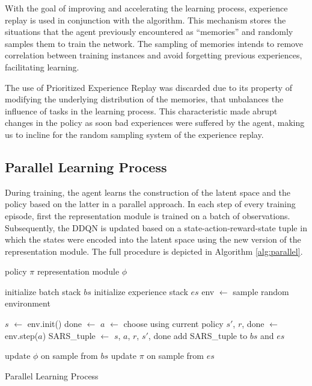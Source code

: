 With the goal of improving and accelerating the learning process, experience replay \citep{replay_memory_oc} is used in conjunction with the algorithm. This mechanism stores the situations that the agent previously encountered as ``memories'' and randomly samples them to train the network. The sampling of memories intends to remove correlation between training instances and avoid forgetting previous experiences, facilitating learning.


The use of Prioritized Experience Replay \citep{prioritized_memory} was discarded due to its property of modifying the underlying distribution of the memories, that unbalances the influence of tasks in the learning process. This characteristic made abrupt changes in the policy as soon bad experiences were suffered by the agent, making us to incline for the random sampling system of the experience replay.

\subsection{Parallel Learning Process}
During training, the agent learns the construction of the latent space and the policy based on the latter in a parallel approach. In each step of every training episode, first the representation module is trained on a batch of observations. Subsequently, the DDQN is updated based on a state-action-reward-state tuple in which the states were encoded into the latent space using the new version of the representation module. The full procedure is depicted in Algorithm \ref{alg:parallel}.

\begin{algorithm}
    \begin{algorithmic}
        \REQUIRE policy $\pi$
        \REQUIRE representation module $\phi$
    
        \STATE initialize batch stack $bs$
        \STATE initialize experience stack $es$
            \STATE env $\leftarrow$ sample random environment
            
            \STATE $s$ $\leftarrow$ env.init()
            \STATE done $\leftarrow$ \FALSE
                \STATE $a$ $\leftarrow$ choose using current policy
                \STATE $s'$, $r$, done $\leftarrow$ env.step($a$)
                \STATE SARS\_tuple $\leftarrow$ $s$, $a$, $r$, $s'$, done
                \STATE add SARS\_tuple to $bs$ and $es$
                
                \STATE update $\phi$ on sample from $bs$
                \STATE update $\pi$ on sample from $es$
            \ENDWHILE
        \ENDFOR
    \end{algorithmic}
    
    \caption{Parallel Learning Process\label{alg:parallel}}
\end{algorithm}

